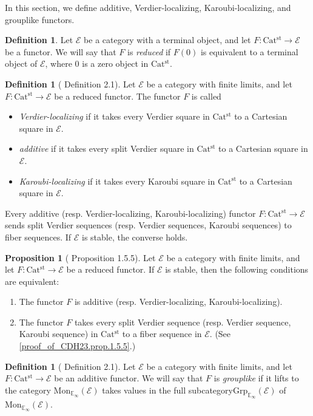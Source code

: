 \documentclass[a4paper,dvipdfmx,11pt,reqno]{amsart}
\newcommand{\E}{\mathcal{E}}
\newcommand{\Catst}{\mathrm{Cat^{st}}}
\newcommand{\Mon}{\mathrm{Mon}_{\mathbb{E}_{\infty}}}
\newcommand{\Grp}{\mathrm{Grp}_{\mathbb{E}_{\infty}}}
\theoremstyle{definition}
\newtheorem{definition}[theorem]{Definition}
\newtheorem{proposition}[theorem]{Proposition}
\begin{document}
In this section, we define additive, Verdier-localizing, Karoubi-localizing, and grouplike functors. 

\begin{definition}
  Let $\E$ be a category with a terminal object, and let $F : \Catst \to \E$ be a functor.
  We will say that $F$ is \textit{reduced} if $F(0)$ is equivalent to a terminal object of $\E$, where $0$ is a zero object in $\Catst$.
\end{definition}

\begin{definition}[\cite{HLS23} Definition 2.1] \label{HLS23.def.2.1} %
  Let $\E$ be a category with finite limits, and let $F : \Catst \to \E$ be a reduced functor.
  The functor $F$ is called 
  \begin{itemize}
    \item \textit{Verdier-localizing} if it takes every Verdier square in $\Catst$ to a Cartesian square in $\E$.
    \item \textit{additive} if it takes every split Verdier square in $\Catst$ to a Cartesian square in $\E$.
    \item \textit{Karoubi-localizing} if it takes every Karoubi square in $\Catst$ to a Cartesian square in $\E$.
  \end{itemize}
\end{definition}

Every additive (resp. Verdier-localizing, Karoubi-localizing) functor $F : \Catst \to \E$ sends split Verdier sequences (resp. Verdier sequences, Karoubi sequences) to fiber sequences.
If $\E$ is stable, the converse holds.

\begin{proposition}[\cite{CDH23} Proposition 1.5.5] \label{CDH23.prop.1.5.5}
  Let $\E$ be a category with finite limits, and let $F : \Catst \to \E$ be a reduced functor.
  If $\E$ is stable, then the following conditions are equivalent:
  \begin{enumerate}
    \item The functor $F$ is additive (resp. Verdier-localizing, Karoubi-localizing).
    \item The functor $F$ takes every split Verdier sequence (resp. Verdier sequence, Karoubi sequence) in $\Catst$ to a fiber sequence in $\E$.
    (See \cref{proof_of_CDH23.prop.1.5.5}.)
  \end{enumerate}
\end{proposition}

\begin{definition}[\cite{HLS23} Definition 2.1] %
  Let $\E$ be a category with finite limits, and let $F : \Catst \to \E$ be an additive functor.
  We will say that $F$ is \textit{grouplike} if it lifts to the category $\Mon(\E)$ takes values in the full subcategory$\Grp(\E)$ of $\Mon(\E)$.
\end{definition}
\end{document}
